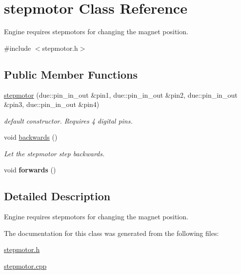 \hypertarget{classstepmotor}{}\section{stepmotor Class Reference}
\label{classstepmotor}


Engine requires stepmotors for changing the magnet position.  




{\ttfamily \#include $<$stepmotor.\+h$>$}

\subsection*{Public Member Functions}
\begin{DoxyCompactItemize}
\item 
\hyperlink{classstepmotor_a74662a622916555217922fe5b8cf50da}{stepmotor} (due\+::pin\+\_\+in\+\_\+out \&pin1, due\+::pin\+\_\+in\+\_\+out \&pin2, due\+::pin\+\_\+in\+\_\+out \&pin3, due\+::pin\+\_\+in\+\_\+out \&pin4)\hypertarget{classstepmotor_a74662a622916555217922fe5b8cf50da}{}\label{classstepmotor_a74662a622916555217922fe5b8cf50da}

\begin{DoxyCompactList}\small\item\em default constructor. Requires 4 digital pins. \end{DoxyCompactList}\item 
void \hyperlink{classstepmotor_a260578d94eb17e10198adfbeb074594a}{backwards} ()\hypertarget{classstepmotor_a260578d94eb17e10198adfbeb074594a}{}\label{classstepmotor_a260578d94eb17e10198adfbeb074594a}

\begin{DoxyCompactList}\small\item\em Let the stepmotor step backwards. \end{DoxyCompactList}\item 
void {\bfseries forwards} ()\hypertarget{classstepmotor_afc35d3be948ecfab5117a62351db4874}{}\label{classstepmotor_afc35d3be948ecfab5117a62351db4874}

\end{DoxyCompactItemize}


\subsection{Detailed Description}
Engine requires stepmotors for changing the magnet position. 

The documentation for this class was generated from the following files\+:\begin{DoxyCompactItemize}
\item 
\hyperlink{stepmotor_8h}{stepmotor.\+h}\item 
\hyperlink{stepmotor_8cpp}{stepmotor.\+cpp}\end{DoxyCompactItemize}
